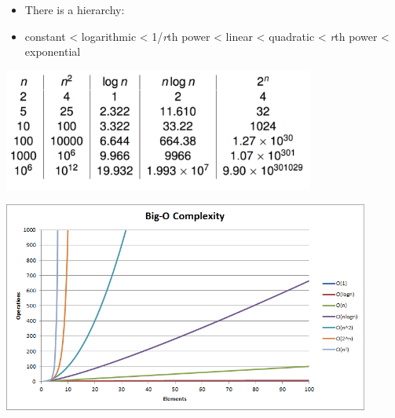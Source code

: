 \documentclass{beamer}
\begin{document}
\begin{frame}
\begin{itemize}
\item There is a hierarchy:
\item constant {\textless} logarithmic {\textless} 1/\textit{r}th power {\textless} linear {\textless} quadratic
{\textless} \textit{r}th power {\textless} exponential
\end{itemize}

\begin{center}
\includegraphics[height=4cm,keepaspectratio]{images/image2}
\end{center}

\end{frame} \begin{frame}

\begin{center}
\includegraphics[height=7cm,keepaspectratio]{images/image3}
\end{center}

\end{frame} 
\end{document}
